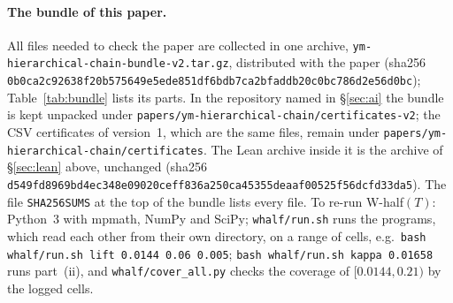 \documentclass[11pt,a4paper]{article}
\theoremstyle{definition}
\theoremstyle{remark}
\newcommand{\code}[1]{\texttt{#1}}
\begin{document}
{\sloppy\paragraph{The bundle of this paper.}
All files needed to check the paper are collected in one archive, \code{ym-hierarchical-chain-bundle-v2.tar.gz}, distributed with the paper (sha256 \code{0b0ca2c92638f20b575649e5ede851df6bdb7ca2bfaddb20c0bc786d2e56d0bc}); Table~\ref{tab:bundle} lists its parts.
In the repository named in \S\ref{sec:ai} the bundle is kept unpacked under \code{papers/\allowbreak{}ym-hierarchical-chain/\allowbreak{}certificates-v2}; the CSV certificates of version~1, which are the same files, remain under \code{papers/\allowbreak{}ym-hierarchical-chain/\allowbreak{}certificates}.
The Lean archive inside it is the archive of \S\ref{sec:lean} above, unchanged (sha256 \code{d549fd8969bd4ec348e09020ceff836a250ca45355deaaf00525f56dcfd33da5}).
The file \code{SHA256SUMS} at the top of the bundle lists every file.
To re-run W-half$(T)$: Python~3 with mpmath, NumPy and SciPy; \code{whalf/run.sh} runs the programs, which read each other from their own directory, on a range of cells, e.g.\ \code{bash whalf/run.sh lift 0.0144 0.06 0.005}; \code{bash whalf/run.sh kappa 0.01658} runs part~(ii), and \code{whalf/cover\_all.py} checks the coverage of $[0.0144,0.21)$ by the logged cells.\par}
\end{document}
